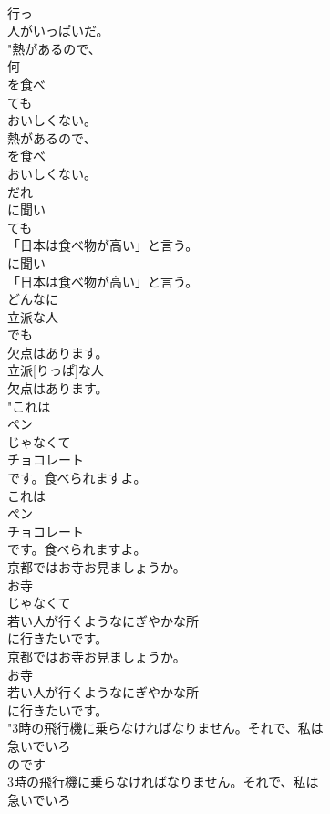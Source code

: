 \documentclass[8pt]{extreport}
\begin{document}
\begin{CJK}{UTF8}{min}
\\	行っ
\\	人がいっぱいだ。
\\	"熱があるので、
\\	何
\\	を食べ
\\	ても
\\	おいしくない。
\\	熱があるので、
\\	を食べ
\\	おいしくない。
\\	だれ
\\	に聞い
\\	ても
\\	「日本は食べ物が高い」と言う。
\\	に聞い
\\	「日本は食べ物が高い」と言う。
\\	どんなに
\\	立派な人
\\	でも
\\	欠点はあります。
\\	立派[りっぱ]な人
\\	欠点はあります。
\\	"これは
\\	ペン
\\	じゃなくて
\\	チョコレート
\\	です。食べられますよ。
\\	これは
\\	ペン
\\	チョコレート
\\	です。食べられますよ。
\\	京都ではお寺お見ましょうか。
\\	お寺
\\	じゃなくて
\\	若い人が行くようなにぎやかな所
\\	に行きたいです。
\\	京都ではお寺お見ましょうか。
\\	お寺
\\	若い人が行くようなにぎやかな所
\\	に行きたいです。
\\	"3時の飛行機に乗らなければなりません。それで、私は
\\	急いでいろ
\\	のです
\\	3時の飛行機に乗らなければなりません。それで、私は
\\	急いでいろ

\end{CJK}
\end{document}
